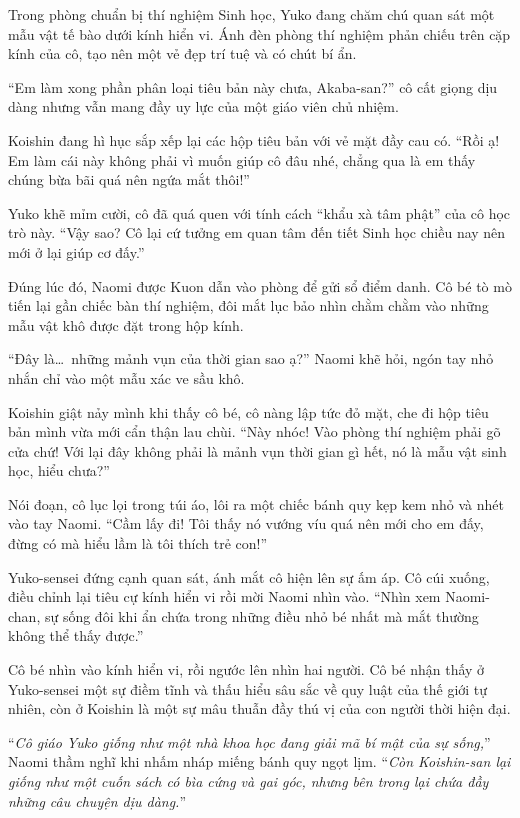 \documentclass[../main.tex]{subfiles}
\begin{document}
Trong phòng chuẩn bị thí nghiệm Sinh học, Yuko đang chăm chú quan sát một mẫu vật tế bào dưới kính hiển vi. Ánh đèn phòng thí nghiệm phản chiếu trên cặp kính của cô, tạo nên một vẻ đẹp trí tuệ và có chút bí ẩn.

``Em làm xong phần phân loại tiêu bản này chưa, Akaba-san?'' cô cất giọng dịu dàng nhưng vẫn mang đầy uy lực của một giáo viên chủ nhiệm.

Koishin đang hì hục sắp xếp lại các hộp tiêu bản với vẻ mặt đầy cau có. ``Rồi ạ! Em làm cái này không phải vì muốn giúp cô đâu nhé, chẳng qua là em thấy chúng bừa bãi quá nên ngứa mắt thôi!''

Yuko khẽ mỉm cười, cô đã quá quen với tính cách ``khẩu xà tâm phật'' của cô học trò này. ``Vậy sao? Cô lại cứ tưởng em quan tâm đến tiết Sinh học chiều nay nên mới ở lại giúp cơ đấy.''

Đúng lúc đó, Naomi được Kuon dẫn vào phòng để gửi sổ điểm danh. Cô bé tò mò tiến lại gần chiếc bàn thí nghiệm, đôi mắt lục bảo nhìn chằm chằm vào những mẫu vật khô được đặt trong hộp kính.

``Đây là\dots\ những mảnh vụn của thời gian sao ạ?'' Naomi khẽ hỏi, ngón tay nhỏ nhắn chỉ vào một mẫu xác ve sầu khô.

Koishin giật nảy mình khi thấy cô bé, cô nàng lập tức đỏ mặt, che đi hộp tiêu bản mình vừa mới cẩn thận lau chùi. ``Này nhóc! Vào phòng thí nghiệm phải gõ cửa chứ! Với lại đây không phải là mảnh vụn thời gian gì hết, nó là mẫu vật sinh học, hiểu chưa?''

Nói đoạn, cô lục lọi trong túi áo, lôi ra một chiếc bánh quy kẹp kem nhỏ và nhét vào tay Naomi. ``Cầm lấy đi! Tôi thấy nó vướng víu quá nên mới cho em đấy, đừng có mà hiểu lầm là tôi thích trẻ con!''

Yuko-sensei đứng cạnh quan sát, ánh mắt cô hiện lên sự ấm áp. Cô cúi xuống, điều chỉnh lại tiêu cự kính hiển vi rồi mời Naomi nhìn vào. ``Nhìn xem Naomi-chan, sự sống đôi khi ẩn chứa trong những điều nhỏ bé nhất mà mắt thường không thể thấy được.''

Cô bé nhìn vào kính hiển vi, rồi ngước lên nhìn hai người. Cô bé nhận thấy ở Yuko-sensei một sự điềm tĩnh và thấu hiểu sâu sắc về quy luật của thế giới tự nhiên, còn ở Koishin là một sự mâu thuẫn đầy thú vị của con người thời hiện đại.

``\textit{Cô giáo Yuko giống như một nhà khoa học đang giải mã bí mật của sự sống,}'' Naomi thầm nghĩ khi nhấm nháp miếng bánh quy ngọt lịm. ``\textit{Còn Koishin-san lại giống như một cuốn sách có bìa cứng và gai góc, nhưng bên trong lại chứa đầy những câu chuyện dịu dàng.}''
\end{document}
